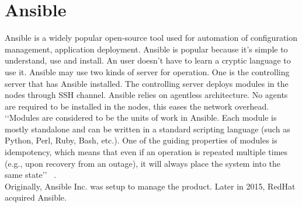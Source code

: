 \section{Ansible}

Ansible is a widely popular open-source tool used for automation of configuration management,
application deployment. Ansible is popular because it’s simple to understand, use and install.
An user doesn’t have to learn a cryptic language to use it.
Ansible may use two kinds of server for operation. One is the controlling server that has Ansible installed.
The controlling server deploys modules in the nodes through SSH channel. Ansible relies on agentless architecture.
No agents are required to be installed in the nodes, this eases the network overhead. \\
‘‘Modules are considered to be the units of work in Ansible. Each module is mostly standalone and can be written in a standard scripting language (such as Python, Perl, Ruby, Bash, etc.). One of the guiding properties of modules is idempotency, which means that even if an operation is repeated multiple times (e.g., upon recovery from an outage), it will always place the system into the same state’’
~\cite {hid-sp18-417-wiki-Ansible}. \\
Originally, Ansible Inc. was setup to manage the product. Later in 2015, RedHat acquired Ansible.
